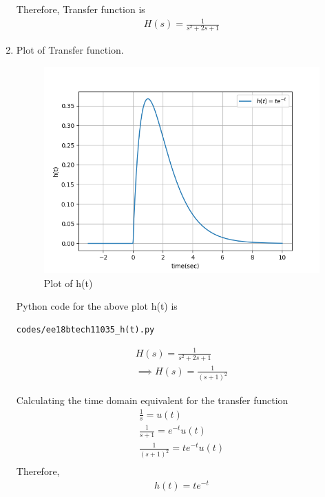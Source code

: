 \begin{enumerate}[label=\thesection.\arabic*.,ref=\thesection.\theenumi]
Therefore, Transfer function is 
\begin{align}
H(s) = \frac{1}{s^2+2s+1}
\end{align}

\item Plot of Transfer function.
\\ \solution  
\begin{figure}[!h]
  \includegraphics[width=\columnwidth]{./figures/ee18btech11035_h(t).png}
 \caption{Plot of h(t)}
  \label{fig:ee18btech11035_h(t)}
\end{figure}

Python code for the above plot h(t) is
\begin{lstlisting}
codes/ee18btech11035_h(t).py
\end{lstlisting}

\begin{align}
H(s) = \frac{1}{s^2+2s+1}\\
\implies H(s) = \frac{1}{(s+1)^2}
\end{align}

Calculating the time domain equivalent for the transfer function\\
\begin{align}
\label{eq:s}
\frac{1}{s} = u(t)\\
\label{eq:s+1}
\frac{1}{s+1} = e^{-t}u(t)\\
\label{eq:(s+1)^2}
\frac{1}{(s+1)^2} = te^{-t}u(t)\\
\end{align}
Therefore,
\begin{align}
h(t) = te^{-t}
\end{align}



\end{enumerate}

